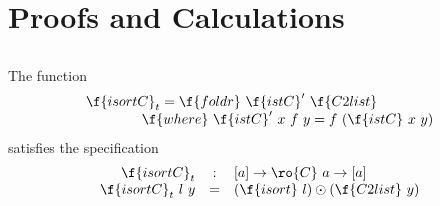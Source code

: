 \documentclass[a4paper,11pt]{llncs}
\begin{document}
\nocite{MeertensL:par}
\nocite{MeijerE:funpbleb}
























\newpage


\appendix

\section{Proofs and Calculations}


\subsection{}
\label{app:sec:isortCt}


The function
$$
\begin{array}{l}
  \f{isortC}_t =  \f{foldr}\ \f{istC}'\ \f{C2list}\\
  \qquad \qquad  \f{where}\   \f{istC}'\ x\ f\ y = f\ (\f{istC}\ x\ y)
\end{array}
$$
satisfies the specification
$$
\begin{array}{rcl}
 \f{isortC}_t & : & [a] \to \ro{C}\ a \to [a]\\
 \f{isortC}_t\ l\ y & = & (\f{isort}\ l) \odot (\f{C2list}\ y)
\end{array}
$$
\end{document}

